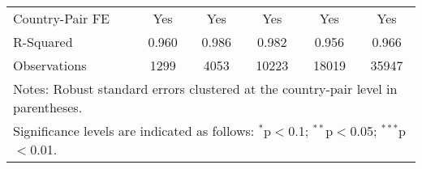 \begin{table}[htbp]
\begin{adjustbox}{max width=\textwidth}
\begin{tabular}{lccccc}
    Country-Pair FE & Yes & Yes & Yes & Yes & Yes \\
    R-Squared & 0.960 & 0.986 & 0.982 & 0.956 & 0.966 \\
    Observations & 1299 & 4053 & 10223 & 18019 & 35947 \\
    \hline
    \multicolumn{6}{l}{\footnotesize{Notes: Robust standard errors clustered at the country-pair level in parentheses.}} \\
    \multicolumn{6}{l}{\footnotesize{Significance levels are indicated as follows: $^{\ast}$p$<$0.1; $^{\ast\ast}$p$<$0.05; $^{\ast\ast\ast}$p$<$0.01.}} \\
    \end{tabular}
    \end{adjustbox}
\end{table}
